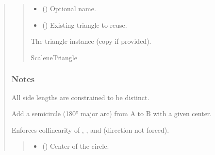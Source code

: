 \documentclass[letterpaper,10pt,english]{sphinxmanual}
\begin{document}
\begin{quote}
\begin{fulllineitems}
\begin{fulllineitems}
\begin{quote}
\begin{description}
\begin{itemize}
\item {} 
\sphinxAtStartPar
{} (\sphinxstyleliteralemphasis{\sphinxupquote{ | }}) \textendash{} Optional name.

\item {} 
\sphinxAtStartPar
{} (\sphinxstyleliteralemphasis{\sphinxupquote{ | }}) \textendash{} Existing triangle to reuse.

\end{itemize}

\sphinxAtStartPar
The triangle instance (copy if provided).

\sphinxAtStartPar
ScaleneTriangle

\end{description}\end{quote}
\subsubsection*{Notes}

\sphinxAtStartPar
All side lengths are constrained to be distinct.

\end{fulllineitems}


\begin{fulllineitems}
\label{\detokenize{pygeox:pygeox.add_objects.AddNamespace.semicircle}}
\pysigstartsignatures
\pysiglinewithargsret
{}
{\sphinxparamcomma {}\sphinxparamcomma {}\sphinxparamcomma {}}
{}
\pysigstopsignatures
\sphinxAtStartPar
Add a semicircle (180° major arc) from A to B with a given center.

\sphinxAtStartPar
Enforces collinearity of , , and  (direction not forced).
\begin{quote}\begin{description}
\begin{itemize}
\item {} 
\sphinxAtStartPar
{} () \textendash{} Center of the circle.


\end{itemize}
\end{description}
\end{quote}
\end{fulllineitems}
\end{fulllineitems}
\end{quote}
\end{document}
